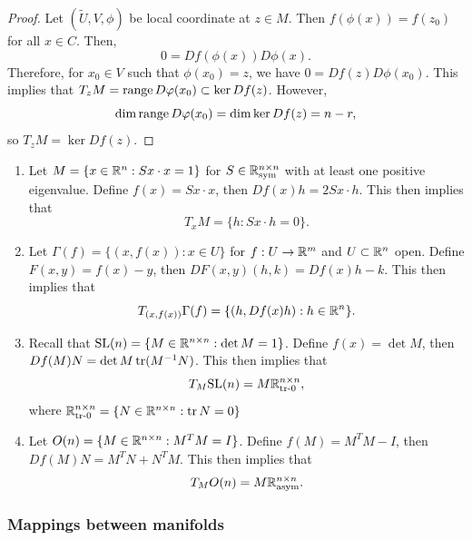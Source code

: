 \documentclass[a4paper]{article}
\begin{document}
\begin{proof}
Let $(\tilde{U}, V, \phi)$ be local coordinate at $z \in M$.
Then $f(\phi(x)) = f(z_0)$ for all $x \in C$. Then,
\[
0 = Df(\phi(x)) D\phi(x).
\]
Therefore, for $x_0 \in V$ such that $\phi(x_0) = z$, we have
$0 = Df(z) D\phi(x_0)$. This implies that
$T_z M = \operatorname{range} D\varphi(x_0) \subset \ker Df(z)$. However,
\[
\dim \operatorname{range} D\varphi(x_0) = \dim \ker Df(z) = n - r,
\]
so
$T_z M = \ker Df(z)$.
\end{proof}

\begin{eg}
\begin{enumerate}
\item Let $M = \{x \in \mathbb{R}^n : S x \cdot x = 1\}$
for $S \in \mathbb{R}^{n \times n}_{\text{sym}}$
with at least one positive eigenvalue. Define
$f(x) = Sx \cdot x$, then
$Df(x) h = 2 Sx \cdot h$. This then implies that
\[
T_x M = \{h : Sx \cdot h = 0\}.
\]

\item Let $\Gamma(f) = \{(x, f(x)) : x \in U\}$ for
$f : U \to \mathbb{R}^m$ and $U \subset \mathbb{R}^n$ open. Define
$F(x, y) = f(x) - y$, then $DF(x, y) (h, k) = Df(x) h - k$.
This then implies that
\[
T_{(x, f(x))} \Gamma(f) = \{(h, Df(x) h) : h \in \mathbb{R}^n\}.
\]

\item Recall that $\mathrm{SL}(n) = \{M \in \mathbb{R}^{n \times n} :
\det M = 1\}$. Define
$f(x) = \det M$, then $Df(M) N = \det M \operatorname{tr} (M^{-1} N)$.
This then implies that
\[
T_M \mathrm{SL}(n) = M \mathbb{R}^{n \times n}_{\text{tr-$0$}},
\]
where $\mathbb{R}^{n \times n}_{\text{tr-$0$}} = \{N \in \mathbb{R}^{n \times n}:
\operatorname{tr} N = 0\}$

\item Let $O(n) = \{M \in \mathbb{R}^{n \times n} : M^T M = I\}$.
Define $f(M) = M^T M - I$, then $Df(M) N = M^T N + N^T M$.
This then implies that
\[
T_M O(n) = M \mathbb{R}^{n \times n}_{\text{asym}}.
\]
\end{enumerate}
\end{eg}

\subsubsection{Mappings between manifolds}
\end{document}
